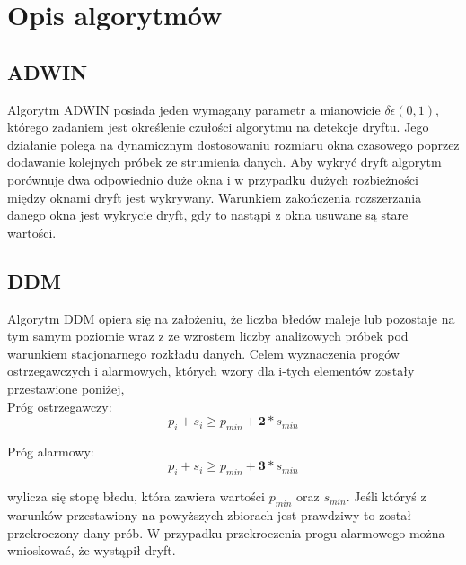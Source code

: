 \documentclass{classrep}
\begin{document}
    \section{Opis algorytmów} {

        \subsection{ADWIN} {
            Algorytm ADWIN\cite{adwin} posiada jeden wymagany parametr a mianowicie
            $\delta \epsilon (0, 1)$, którego zadaniem jest określenie czułości
            algorytmu na detekcje dryftu. Jego działanie polega na dynamicznym
            dostosowaniu rozmiaru okna czasowego poprzez dodawanie kolejnych próbek ze
            strumienia danych. Aby wykryć dryft algorytm porównuje dwa odpowiednio duże
            okna i w przypadku dużych rozbieżności między oknami dryft jest wykrywany.
            Warunkiem zakończenia rozszerzania danego okna jest wykrycie dryft, gdy to
            nastąpi z okna usuwane są stare wartości.
        }

        \subsection{DDM} {
            Algorytm DDM\cite{ddm} opiera się na założeniu, że liczba błedów maleje lub
            pozostaje na tym samym poziomie wraz z ze wzrostem liczby analizowych próbek
            pod warunkiem stacjonarnego rozkładu danych. Celem wyznaczenia progów
            ostrzegawczych i alarmowych, których wzory dla i-tych elementów zostały
            przestawione poniżej,\\

            Próg ostrzegawczy:
            $$
            p_i+s_i \geqslant p_{min}+\textbf{2}*s_{min}
            $$

            Próg alarmowy:
            $$
            p_i+s_i \geqslant p_{min}+\textbf{3}*s_{min}
            $$

            wylicza się stopę błedu, która zawiera wartości $p_{min}$ oraz
            $s_{min}$. Jeśli któryś z warunków przestawiony na powyższych zbiorach
            jest prawdziwy to został przekroczony dany prób. W przypadku przekroczenia
            progu alarmowego można wnioskować, że wystąpił dryft.
        }

}
\end{document}
